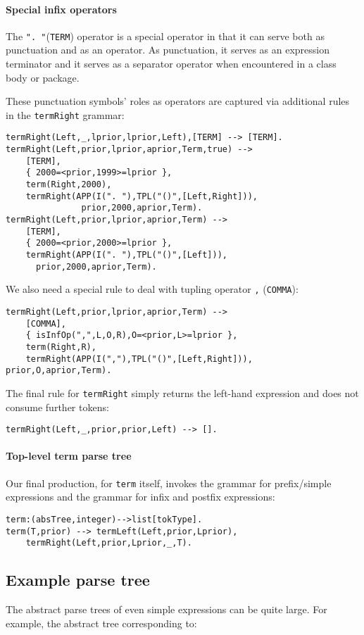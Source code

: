 \paragraph{Special infix operators}     
The \verb+". "+(\verb+TERM+) operator is a special operator in that it can serve both as punctuation and as an operator. As punctuation, it serves as an expression terminator and it serves as a separator operator when encountered in a class body or package.

These punctuation symbols' roles as operators are captured via additional rules in the \verb+termRight+ grammar:
\begin{verbatim}
termRight(Left,_,lprior,lprior,Left),[TERM] --> [TERM].
termRight(Left,prior,lprior,aprior,Term,true) --> 
    [TERM],
    { 2000=<prior,1999>=lprior },
    term(Right,2000),
    termRight(APP(I(". "),TPL("()",[Left,Right])),
               prior,2000,aprior,Term).
termRight(Left,prior,lprior,aprior,Term) -->
    [TERM],
    { 2000=<prior,2000>=lprior },
    termRight(APP(I(". "),TPL("()",[Left])),
      prior,2000,aprior,Term).
\end{verbatim}
We also need a special rule to deal with tupling operator \verb+,+ (\verb+COMMA+):
\begin{verbatim}
termRight(Left,prior,lprior,aprior,Term) -->
    [COMMA],
    { isInfOp(",",L,O,R),O=<prior,L>=lprior },
    term(Right,R),
    termRight(APP(I(","),TPL("()",[Left,Right])), prior,O,aprior,Term).
\end{verbatim}
The final rule for \verb+termRight+ simply returns the left-hand expression and does not consume further tokens:
\begin{verbatim}
termRight(Left,_,prior,prior,Left) --> [].
\end{verbatim}

\paragraph{Top-level term parse tree}       
Our final production, for \verb+term+ itself, invokes the grammar for prefix/simple expressions and the grammar for infix and postfix expressions:
\begin{verbatim}
term:(absTree,integer)-->list[tokType].
term(T,prior) --> termLeft(Left,prior,Lprior),
    termRight(Left,prior,Lprior,_,T).
\end{verbatim}


\subsection{Example parse tree}
The abstract parse trees of even simple expressions can be quite large. For example, the abstract tree corresponding to:

